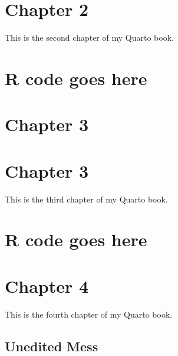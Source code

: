 \documentclass[
  letterpaper,
  DIV=11,
  numbers=noendperiod]{scrreprt}
\begin{document}

\chapter{Chapter 2}\label{chapter-2-1}

This is the second chapter of my Quarto book.


\chapter{R code goes here}\label{r-code-goes-here-1}


\chapter{Chapter 3}\label{chapter-3}


\chapter{Chapter 3}\label{chapter-3-1}

This is the third chapter of my Quarto book.


\chapter{R code goes here}\label{r-code-goes-here-2}


\chapter{Chapter 4}\label{chapter-4}

This is the fourth chapter of my Quarto book.

\section{Unedited Mess}
\end{document}
